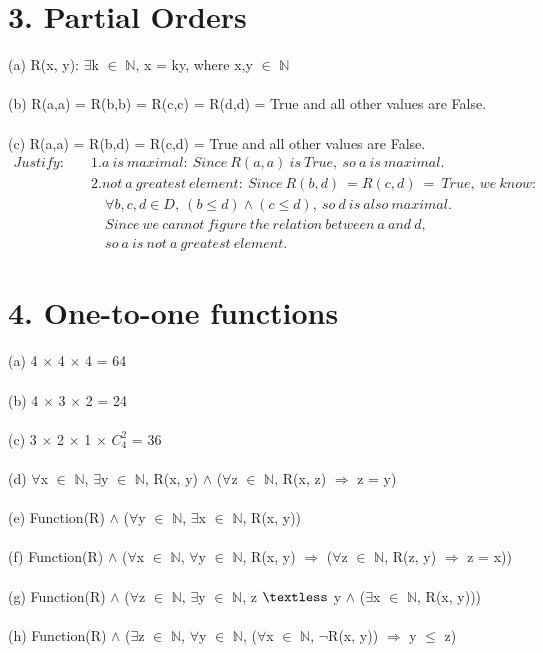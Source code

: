 \documentclass[12pt]{article}
\begin{document}
\vspace{20pt}

\section*{3. Partial Orders}

\vspace{20pt}

(a) R(x, y): $\exists$k $\in$ $\mathbb{N}$, x = ky, where x,y $\in$ $\mathbb{N}$ \\
~\\
(b) R(a,a) = R(b,b) = R(c,c) = R(d,d) = True and all other values are False. \\
~\\
(c) R(a,a) = R(b,d) = R(c,d) = True and all other values are False. \\
\begin{align*}
Justify:\quad &1.a\ is\ maximal:\ Since\ R(a,a)\ is\ True,\ so\ a\ is\ maximal.  \\
&2.not\ a\ greatest\ element:\ Since\ R(b,d)\ = R(c,d)\ =\ True,\ we\ know: \\
&\quad \forall b,c,d \in D,\ (b \leq d) \wedge (c \leq d),\ so\ d\ is\ also\ maximal. \\
&\quad Since\ we\ cannot\ figure\ the\ relation\ between\ a\ and\ d,\\
&\quad so\ a\ is\ not\ a\ greatest\ element.
\end{align*}


\newpage

\section*{4. One-to-one functions}

\vspace{20pt}

(a) 4 $\times$ 4 $\times$ 4 = 64 \\
~\\
(b) 4 $\times$ 3 $\times$ 2 = 24 \\
~\\
(c) 3 $\times$ 2 $\times$ 1 $\times$ $C_4^2$ = 36 \\
~\\
(d) $\forall$x $\in$ $\mathbb{N}$, $\exists$y $\in$ $\mathbb{N}$, R(x, y) $\wedge$ 
($\forall$z $\in$ $\mathbb{N}$, R(x, z) $\Rightarrow$ z = y) \\
~\\
(e) Function(R) $\wedge$ ($\forall$y $\in$ $\mathbb{N}$, $\exists$x $\in$ $\mathbb{N}$, R(x, y)) \\
~\\
(f) Function(R) $\wedge$ ($\forall$x $\in$ $\mathbb{N}$, $\forall$y $\in$ $\mathbb{N}$, R(x, y) $\Rightarrow$ ($\forall$z $\in$ $\mathbb{N}$, R(z, y) $\Rightarrow$ z = x)) \\
~\\
(g) Function(R) $\wedge$ ($\forall$z $\in$ $\mathbb{N}$, $\exists$y $\in$ $\mathbb{N}$, z $\textless$ y $\wedge$ ($\exists$x $\in$ $\mathbb{N}$, R(x, y))) \\
~\\
(h) Function(R) $\wedge$ ($\exists$z $\in$ $\mathbb{N}$, $\forall$y $\in$ $\mathbb{N}$, ($\forall$x $\in$ $\mathbb{N}$, $\neg$R(x, y)) $\Rightarrow$ y $\leq$ z)
\end{document}
